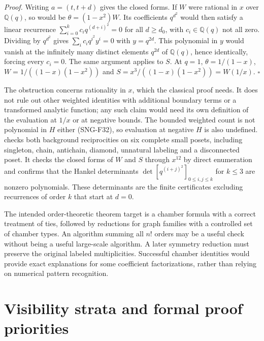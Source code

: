 \documentclass[
  11pt,
  a4paper,
]{report}
\let\singularitytexttt\texttt
\renewcommand{\texttt}[1]{\singularitytexttt{\seqsplit{#1}}}
\begin{document}
\emph{Proof.} Writing \(a=(t,t+d)\) gives the closed forms. If \(W\)
were rational in \(x\) over \(\mathbb Q(q)\), so would be
\(\theta=(1-x^2)W\). Its coefficients \(q^{d^2}\) would then satisfy a
linear recurrence \(\sum_{i=0}^kc_iq^{(d+i)^2}=0\) for all \(d\ge d_0\),
with \(c_i\in\mathbb Q(q)\) not all zero. Dividing by \(q^{d^2}\) gives
\(\sum_ic_iq^{i^2}y^i=0\) with \(y=q^{2d}\). This polynomial in \(y\)
would vanish at the infinitely many distinct elements \(q^{2d}\) of
\(\mathbb Q(q)\), hence identically, forcing every \(c_i=0\). The same
argument applies to \(S\). At \(q=1\), \(\theta=1/(1-x)\),
\(W=1/((1-x)(1-x^2))\) and \(S=x^3/((1-x)(1-x^2))=W(1/x)\). \(\square\)

The obstruction concerns rationality in \(x\), which the classical proof
needs. It does not rule out other weighted identities with additional
boundary terms or a transformed analytic function; any such claim would
need its own definition of the evaluation at \(1/x\) or at negative
bounds. The bounded weighted count is not polynomial in \(H\) either
(SNG-F32), so evaluation at negative \(H\) is also undefined.
\texttt{tests/test\_reciprocity.py} checks both background reciprocities
on six complete small posets, including singleton, chain, antichain,
diamond, unnatural labeling and a disconnected poset. It checks the
closed forms of \(W\) and \(S\) through \(x^{12}\) by direct enumeration
and confirms that the Hankel determinants
\(\det[q^{(i+j)^2}]_{0\le i,j\le k}\) for \(k\le3\) are nonzero
polynomials. These determinants are the finite certificates excluding
recurrences of order \(k\) that start at \(d=0\).

The intended order-theoretic theorem target is a chamber formula with a
correct treatment of ties, followed by reductions for graph families
with a controlled set of chamber types. An algorithm summing all \(n!\)
orders may be a useful check without being a useful large-scale
algorithm. A later symmetry reduction must preserve the original labeled
multiplicities. Successful chamber identities would provide exact
explanations for some coefficient factorizations, rather than relying on
numerical pattern recognition.

\hypertarget{visibility-strata-and-formal-proof-priorities}{%
\section{Visibility strata and formal proof
priorities}\label{visibility-strata-and-formal-proof-priorities}}
\end{document}
